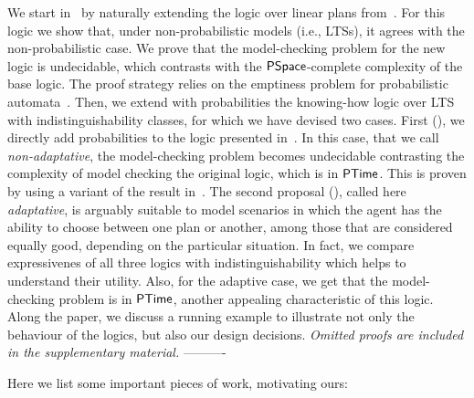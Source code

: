 We start in~ by naturally extending the logic over linear plans from~\cite{Wang15lori,Wang16,Wang2016}.  For this logic we show that, under non-probabilistic models (i.e., LTSs), it agrees with the non-probabilistic case. We prove that the model-checking problem for the new logic is undecidable,  which contrasts  with the ${\rm\textsf{PSpace}}$-complete complexity of the base logic. The proof strategy relies on the emptiness problem for probabilistic automata~\cite{MadaniHC99}. Then, we extend with probabilities the knowing-how logic over LTS with indistinguishability classes, for which we have devised two cases.  First (), we directly add probabilities to the logic presented in~\cite{AFSVQ21}.  In this case,  that we call \emph{non-adaptative}, the model-checking problem becomes undecidable  contrasting the complexity of model checking the original logic, which is in  ${\rm\textsf{PTime}}$. This is proven by using a variant of the result in~\cite{MadaniHC99}. The second proposal (), called here \emph{adaptative}, is arguably suitable to model scenarios in which the agent has the ability to choose between one plan or another, among those that are considered equally good, depending on the particular situation. In fact, we compare expressivenes of all three logics with indistinguishability which helps to understand their utility. Also, for the adaptive case, 
we get that the model-checking problem is in ${\rm\textsf{PTime}}$, another appealing characteristic of this logic. Along the paper, we discuss a running example to illustrate not only the behaviour of the logics, but also our design decisions. 
\emph{Omitted proofs are included in the supplementary material.}
\iffalse
---------- 

Here we list some important pieces of work, motivating ours:

